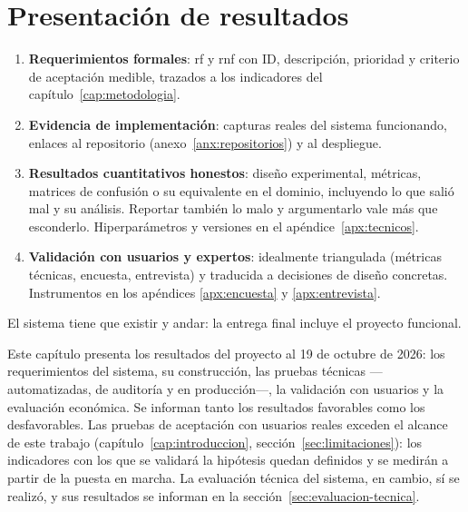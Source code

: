 
\chapter{Presentación de resultados}\label{cap:resultados}

\begin{guia}
\begin{enumerate}
    \item \textbf{Requerimientos formales}: \gls{rf} y \gls{rnf} con ID,
          descripción, prioridad y criterio de aceptación medible,
          trazados a los indicadores del capítulo~\ref{cap:metodologia}.
    \item \textbf{Evidencia de implementación}: capturas reales del sistema
          funcionando, enlaces al repositorio (anexo~\ref{anx:repositorios})
          y al despliegue.
    \item \textbf{Resultados cuantitativos honestos}: diseño experimental,
          métricas, matrices de confusión o su equivalente en el dominio,
          incluyendo lo que salió mal y su análisis. Reportar también lo
          malo y argumentarlo vale más que esconderlo. Hiperparámetros y
          versiones en el apéndice~\ref{apx:tecnicos}.
    \item \textbf{Validación con usuarios y expertos}: idealmente
          triangulada (métricas técnicas, encuesta, entrevista) y
          traducida a decisiones de diseño concretas. Instrumentos en los
          apéndices \ref{apx:encuesta} y \ref{apx:entrevista}.
\end{enumerate}
El sistema tiene que existir y andar: la entrega final incluye el
proyecto funcional.
\end{guia}

Este capítulo presenta los resultados del proyecto al 19 de octubre de
2026: los requerimientos del sistema, su construcción, las pruebas
técnicas ---automatizadas, de auditoría y en producción---, la validación
con usuarios y la evaluación económica. Se informan tanto los resultados
favorables como los desfavorables. Las pruebas de aceptación con usuarios
reales exceden el alcance de este trabajo
(capítulo~\ref{cap:introduccion}, sección~\ref{sec:limitaciones}): los
indicadores con los que se validará la hipótesis quedan definidos y se
medirán a partir de la puesta en marcha.
La evaluación técnica del sistema, en cambio, sí se realizó, y sus
resultados se informan en la sección~\ref{sec:evaluacion-tecnica}.

